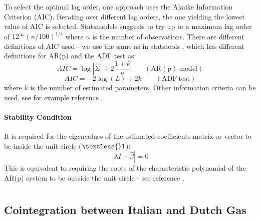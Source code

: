 \documentclass[11pt]{article}
\begin{document}
\begin{appendices}
To select the optimal lag order, one approach uses the Akaike
Information Criterion (AIC). Iterating over different lag orders, the
one yielding the lowest value of AIC is selected. Statsmodels suggests to
try up to a maximum lag order of \(12*(n/100)^{1/4}\) where \(n\) is the
number of observations.
There are different definitions of AIC used - we use the same as in
statstools \cite{statstools},
which has different definitions for AR(p) and the ADF test as:
\begin{equation}
AIC = \log | \hat{\Sigma} |+ 2 \frac{1 + k}{n} \qquad \mathrm{(AR(p) \ model)}
\end{equation}
\begin{equation}
AIC = -2 \log(L) + 2k  \qquad \mathrm{(ADF \ test)} 
\end{equation}
where \(k\) is the number of estimated parameters. Other information
criteria can be used, see for example reference \cite{ref}.

    \subsubsection{Stability Condition}\label{stability-condition}
    
It is required for the eigenvalues of the estimated coefficients matrix or
vector to be inside the unit circle ($ \textless{} 1$): \begin{equation}
| \lambda I - \hat{\beta} | = 0
\end{equation} This is equivalent to requiring the roots of the characteristic
polynomial of the AR(p) system to be outside the unit circle - see
reference \cite{ref}.

\chapter{} \label{appendixB}

    \section{Cointegration between Italian and Dutch Gas}\label{cointegration-between-italian-and-dutch-gas}
    
    \begin{center}
    \end{center}
    { \hspace*{\fill} \\}
    \begin{center}
    \end{center}
    { \hspace*{\fill} \\}
    \begin{center}
    \end{center}
    { \hspace*{\fill} \\}


\end{appendices}
\end{document}
